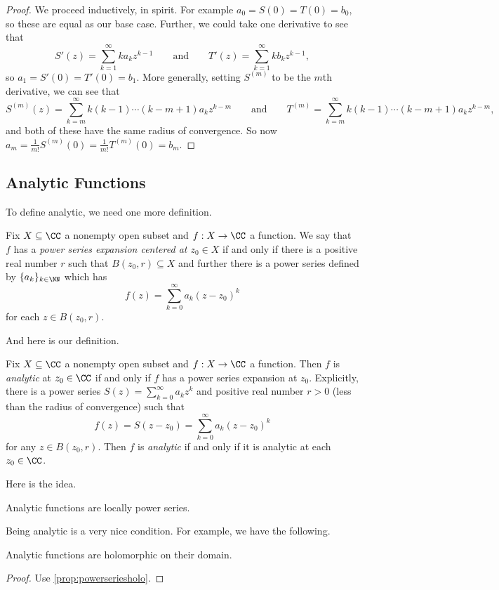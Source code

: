 \begin{proof}
	We proceed inductively, in spirit. For example $a_0=S(0)=T(0)=b_0$, so these are equal as our base case. Further, we could take one derivative to see that
	\[S'(z)=\sum_{k=1}^\infty ka_kz^{k-1}\qquad\text{and}\qquad T'(z)=\sum_{k=1}^\infty kb_kz^{k-1},\]
	so $a_1=S'(0)=T'(0)=b_1$. More generally, setting $S^{(m)}$ to be the $m$th derivative, we can see that
	\[S^{(m)}(z)=\sum_{k=m}^\infty k(k-1)\cdots(k-m+1)a_kz^{k-m}\qquad\text{and}\qquad T^{(m)}=\sum_{k=m}^\infty k(k-1)\cdots(k-m+1)a_kz^{k-m},\]
	and both of these have the same radius of convergence. So now $a_m=\frac1{m!}S^{(m)}(0)=\frac1{m!}T^{(m)}(0)=b_m$.
\end{proof}

\subsection{Analytic Functions}
To define analytic, we need one more definition.
\begin{definition}
	Fix $X\subseteq\CC$ a nonempty open subset and $f:X\to\CC$ a function. We say that $f$ has a \textit{power series expansion centered at $z_0\in X$}
	if and only if there is a positive real number $r$ such that $B(z_0,r)\subseteq X$ and further there is a power series defined by
	$\{a_k\}_{k\in\NN}$ which has
	\[f(z)=\sum_{k=0}^\infty a_k(z-z_0)^k\]
	for each $z\in B(z_0,r)$.
\end{definition}
And here is our definition.
\begin{definition}[Analytic]
	Fix $X\subseteq\CC$ a nonempty open subset and $f:X\to\CC$ a function. Then $f$ is \textit{analytic} at $z_0\in\CC$ if and only if $f$ has a power series expansion at $z_0$. Explicitly, there is a power series $S(z)=\sum_{k=0}^\infty a_kz^k$ and positive real number $r>0$ (less than the radius of convergence) such that
	\[f(z)=S(z-z_0)=\sum_{k=0}^\infty a_k(z-z_0)^k\]
	for any $z\in B(z_0,r)$. Then $f$ is \textit{analytic} if and only if it is analytic at each $z_0\in\CC$.
\end{definition}
Here is the idea.
\begin{idea}
	Analytic functions are locally power series.
\end{idea}
Being analytic is a very nice condition. For example, we have the following.
\begin{proposition}
	Analytic functions are holomorphic on their domain.
\end{proposition}
\begin{proof}
	Use \autoref{prop:powerseriesholo}.
\end{proof}
